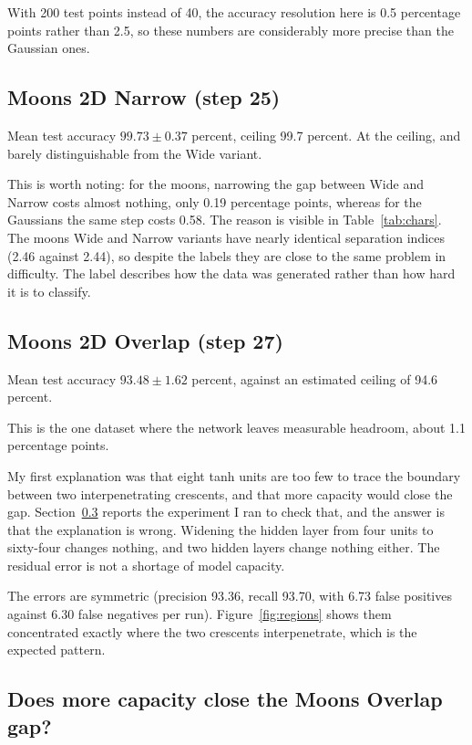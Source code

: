 \documentclass[11pt]{article}
\begin{document}
With 200 test points instead of 40, the accuracy resolution here is 0.5
percentage points rather than 2.5, so these numbers are considerably more
precise than the Gaussian ones.

\subsection{Moons 2D Narrow (step 25)}

Mean test accuracy $99.73 \pm 0.37$ percent, ceiling 99.7 percent. At the
ceiling, and barely distinguishable from the Wide variant.

This is worth noting: for the moons, narrowing the gap between Wide and Narrow
costs almost nothing, only 0.19 percentage points, whereas for the Gaussians the
same step costs 0.58. The reason is visible in Table~\ref{tab:chars}. The moons
Wide and Narrow variants have nearly identical separation indices (2.46 against
2.44), so despite the labels they are close to the same problem in difficulty.
The label describes how the data was generated rather than how hard it is to
classify.

\subsection{Moons 2D Overlap (step 27)}

Mean test accuracy $93.48 \pm 1.62$ percent, against an estimated ceiling of
94.6 percent.

This is the one dataset where the network leaves measurable headroom, about 1.1
percentage points.

My first explanation was that eight tanh units are too few to trace the boundary
between two interpenetrating crescents, and that more capacity would close the
gap. Section~\ref{sec:capacity} reports the experiment I ran to check that, and
the answer is that the explanation is wrong. Widening the hidden layer from four
units to sixty-four changes nothing, and two hidden layers change nothing
either. The residual error is not a shortage of model capacity.

The errors are symmetric (precision 93.36, recall 93.70, with 6.73 false
positives against 6.30 false negatives per run). Figure~\ref{fig:regions} shows
them concentrated exactly where the two crescents interpenetrate, which is the
expected pattern.

\subsection{Does more capacity close the Moons Overlap gap?}
\label{sec:capacity}
\end{document}
